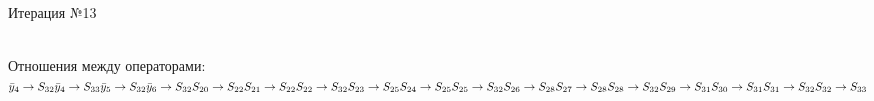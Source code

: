 \documentclass[a4paper,14pt]{article}
\begin{document}
\newpage \\ 
\begin{center}\huge Итерация №13 \end{center}\\
Отношения между операторами: \\ \newline
\begin{math}
    \bar{y}_{4} \rightarrow S_{32} \\ 
\bar{y}_{4} \rightarrow S_{33} \\ 
\bar{y}_{5} \rightarrow S_{32} \\ 
\bar{y}_{6} \rightarrow S_{32} \\ 
S_{20} \rightarrow S_{22} \\ 
S_{21} \rightarrow S_{22} \\ 
S_{22} \rightarrow S_{32} \\ 
S_{23} \rightarrow S_{25} \\ 
S_{24} \rightarrow S_{25} \\ 
S_{25} \rightarrow S_{32} \\ 
S_{26} \rightarrow S_{28} \\ 
S_{27} \rightarrow S_{28} \\ 
S_{28} \rightarrow S_{32} \\ 
S_{29} \rightarrow S_{31} \\ 
S_{30} \rightarrow S_{31} \\ 
S_{31} \rightarrow S_{32} \\ 
S_{32} \rightarrow S_{33}
\end{math} \\ \\ \\ 
%
\end{document}
